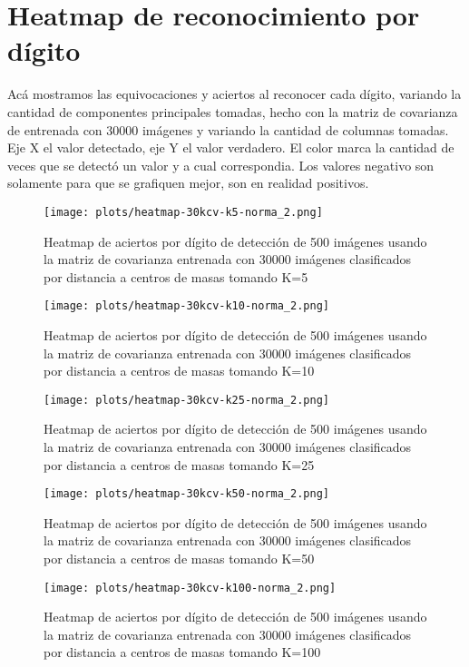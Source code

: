 \section{Heatmap de reconocimiento por d\'igito}
Ac\'a mostramos las equivocaciones y aciertos al reconocer cada d\'igito, variando la cantidad de componentes principales tomadas, hecho con la matriz de covarianza de
entrenada con 30000 im\'agenes y variando la cantidad de columnas tomadas. Eje X el valor detectado, eje Y el valor verdadero. El color marca la cantidad
de veces que se detect\'o un valor y a cual correspondia. Los valores negativo son solamente para que se grafiquen mejor,
son en realidad positivos.

\def \hmwidth {500pt}
\begin{figure}[H]
\texttt{[image: plots/heatmap-30kcv-k5-norma\_2.png]}
\caption{Heatmap de aciertos por d\'igito de detecci\'on de 500 im\'agenes usando la matriz de covarianza entrenada con 30000 im\'agenes
clasificados por distancia a centros de masas tomando K=5}
\label{fig:HM30kcv-k5}
\end{figure}

\begin{figure}[H]
\texttt{[image: plots/heatmap-30kcv-k10-norma\_2.png]}
\caption{Heatmap de aciertos por d\'igito de detecci\'on de 500 im\'agenes usando la matriz de covarianza entrenada con 30000 im\'agenes
clasificados por distancia a centros de masas tomando K=10 }
\label{fig:HM30kcv-k10}
\end{figure}

\begin{figure}[H]
\texttt{[image: plots/heatmap-30kcv-k25-norma\_2.png]}
\caption{Heatmap de aciertos por d\'igito de detecci\'on de 500 im\'agenes usando la matriz de covarianza entrenada con 30000 im\'agenes
clasificados por distancia a centros de masas tomando K=25 }
\label{fig:HM30kcv-k25}
\end{figure}

\begin{figure}[H]
\texttt{[image: plots/heatmap-30kcv-k50-norma\_2.png]}
\caption{Heatmap de aciertos por d\'igito de detecci\'on de 500 im\'agenes usando la matriz de covarianza entrenada con 30000 im\'agenes
clasificados por distancia a centros de masas tomando K=50 }
\label{fig:HM30kcv-k50}
\end{figure}

\begin{figure}[H]
\texttt{[image: plots/heatmap-30kcv-k100-norma\_2.png]}
\caption{Heatmap de aciertos por d\'igito de detecci\'on de 500 im\'agenes usando la matriz de covarianza entrenada con 30000 im\'agenes
clasificados por distancia a centros de masas tomando K=100 }
\label{fig:HM30kcv-k100}
\end{figure}

